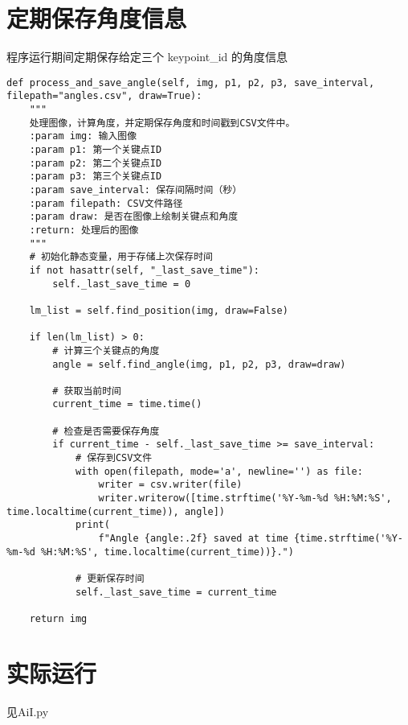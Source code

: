 \section{定期保存角度信息}

程序运行期间定期保存给定三个 keypoint\_id 的角度信息

\begin{lstlisting}
def process_and_save_angle(self, img, p1, p2, p3, save_interval, filepath="angles.csv", draw=True):
    """
    处理图像，计算角度，并定期保存角度和时间戳到CSV文件中。
    :param img: 输入图像
    :param p1: 第一个关键点ID
    :param p2: 第二个关键点ID
    :param p3: 第三个关键点ID
    :param save_interval: 保存间隔时间（秒）
    :param filepath: CSV文件路径
    :param draw: 是否在图像上绘制关键点和角度
    :return: 处理后的图像
    """
    # 初始化静态变量，用于存储上次保存时间
    if not hasattr(self, "_last_save_time"):
        self._last_save_time = 0

    lm_list = self.find_position(img, draw=False)

    if len(lm_list) > 0:
        # 计算三个关键点的角度
        angle = self.find_angle(img, p1, p2, p3, draw=draw)

        # 获取当前时间
        current_time = time.time()

        # 检查是否需要保存角度
        if current_time - self._last_save_time >= save_interval:
            # 保存到CSV文件
            with open(filepath, mode='a', newline='') as file:
                writer = csv.writer(file)
                writer.writerow([time.strftime('%Y-%m-%d %H:%M:%S', time.localtime(current_time)), angle])
            print(
                f"Angle {angle:.2f} saved at time {time.strftime('%Y-%m-%d %H:%M:%S', time.localtime(current_time))}.")

            # 更新保存时间
            self._last_save_time = current_time

    return img
\end{lstlisting}

\section{实际运行}

见AiI.py